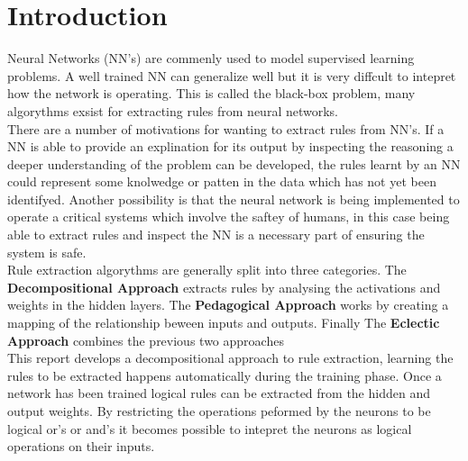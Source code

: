\chapter{Introduction}\label{C:intro}
Neural Networks (NN's) are commenly used to model supervised learning problems. A well trained NN can generalize well but it is very diffcult to intepret how the network is operating. This is called the black-box problem, many algorythms exsist for extracting rules from neural networks.\\

There are a number of motivations for wanting to extract rules from NN's. If a NN is able to provide an explination for its output by inspecting the reasoning a deeper understanding of the problem can be developed, the rules learnt by an NN could represent some knolwedge or patten in the data which has not yet been identifyed. Another possibility is that the neural network is being implemented to operate a critical systems which involve the saftey of humans, in this case being able to extract rules and inspect the NN is a necessary part of ensuring the system is safe.\\

Rule extraction algorythms are generally split into three categories. The \textbf{Decompositional Approach} extracts rules by analysing the activations and weights in the hidden layers. The \textbf{Pedagogical Approach} works by creating a  mapping of the relationship beween inputs and outputs. Finally The \textbf{Eclectic Approach} combines the previous two approaches\\

This report develops a decompositional approach to rule extraction, learning the rules to be extracted happens automatically during the training phase. Once a network has been trained logical rules can be extracted from the hidden and output weights. By restricting the operations peformed by the neurons to be logical or's or and's it becomes possible to intepret the neurons as logical operations on their inputs.


